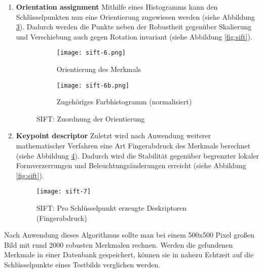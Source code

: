 \begin{enumerate}
    \item \textbf{Orientation assignment}\newline
    Mithilfe eines Histogramms kann den Schlüsselpunkten nun eine Orientierung
    zugewiesen werden (siehe Abbildung \ref{fig:sift-orientation}). Dadurch
    werden die Punkte neben der Robustheit gegenüber Skalierung und Verschiebung
    auch gegen Rotation invariant (siehe Abbildung \ref{fig:sift}).
    \parencite{sift-web-orientation}

    \begin{figure}[H]
        \centering
        \begin{subfigure}{.5\textwidth}
          \centering
          \texttt{[image: sift-6.png]}
          \caption{Orientierung des Merkmals}
          \label{fig:sift6}
        \end{subfigure}%
        \begin{subfigure}{.5\textwidth}
          \centering
          \texttt{[image: sift-6b.png]}
          \caption{Zugehöriges Farbhistogramm (normalisiert)}
          \label{fig:sift6b}
        \end{subfigure}
        \caption{SIFT: Zuordnung der Orientierung}
        \label{fig:sift-orientation}
    \end{figure}

    \item \textbf{Keypoint descriptor}\newline
    Zuletzt wird nach Anwendung weiterer mathematischer Verfahren eine Art
    Fingerabdruck des Merkmals berechnet (siehe Abbildung \ref{fig:sift7}).
    Dadurch wird die Stabilität gegenüber begrenzter lokaler Formverzerrungen
    und Beleuchtungsänderungen erreicht (siehe Abbildung \ref{fig:sift}).
    \parencite{sift-web-descriptor}

    \begin{figure}[H]
        \centering
        \texttt{[image: sift-7]}
        \caption{SIFT: Pro Schlüsselpunkt erzeugte Deskriptoren (Fingerabdruck)}
        \label{fig:sift7}
    \end{figure}
\end{enumerate}

Nach Anwendung dieses Algorithmus sollte man bei einem 500x500 Pixel großen Bild
mit rund 2000 robusten Merkmalen rechnen. Werden die gefundenen Merkmale in
einer Datenbank gespeichert, können sie in nahezu Echtzeit auf die
Schlüsselpunkte eines Testbilds verglichen werden.
\parencite{sift-distinctive-features}

